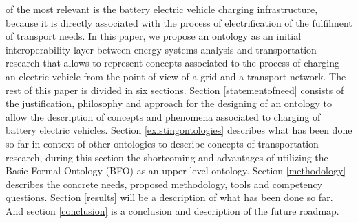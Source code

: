 of the most relevant is the battery electric vehicle charging infrastructure,
because it is directly associated with the process of electrification of the
fulfilment of transport needs. In this paper, we propose an ontology as an
initial interoperability layer between energy systems analysis and
transportation research that allows to represent concepts associated to the
process of charging an electric vehicle from the point of view of a grid and a
transport network. The rest of this paper is divided in six sections. Section
\ref{statementofneed} consists of the justification, philosophy and approach
for the designing of an ontology to allow the description of concepts and
phenomena associated to charging of battery electric vehicles. Section
\ref{existingontologies} describes what has been done so far in context of
other ontologies to describe concepts of transportation research, during this
section the shortcoming and advantages of utilizing the Basic Formal Ontology
(BFO) \cite{Arp.2015} as an upper level ontology. Section \ref{methodology}
describes the concrete needs, proposed methodology, tools and competency
questions. Section \ref{results} will be a description of what has been done
so far. And section \ref{conclusion} is a conclusion and description of the
future roadmap.

